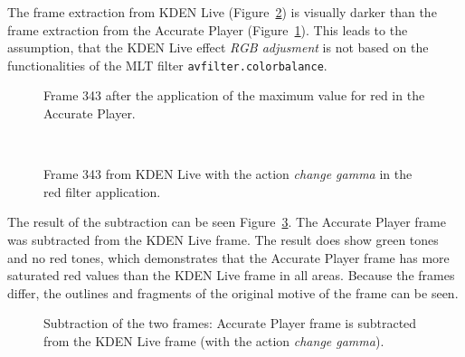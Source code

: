 \documentclass[../MasterThesis.tex]{subfiles}
\begin{document}
The frame extraction from KDEN Live (Figure~\ref{figure:gamma}) is visually darker than the frame extraction from the Accurate Player (Figure~\ref{figure:APframe1}). This leads to the assumption, that the KDEN Live effect \textit{RGB adjusment} is not based on the functionalities of the MLT filter \texttt{avfilter.colorbalance}.

\begin{minipage}{0.48\textwidth}
	\begin{figure}[H]
		\begin{center}
			\caption[Frame 343 after the application of the red filter in the Accurate Player.]{Frame 343 after the application of the maximum value for red in the Accurate Player.}
			\label{figure:APframe1}
		\end{center}
	\end{figure}
\end{minipage}\begin{minipage}{0.04\textwidth}
	\ 
\end{minipage}\begin{minipage}{0.48\textwidth}
	\begin{figure}[H]
		\begin{center}
			\caption[Frame 343 from KDEN Live with the action \textit{change gamma}.]{Frame 343 from KDEN Live with the action \textit{change gamma} in the red filter application.}
			\label{figure:gamma}
		\end{center}
	\end{figure}
\end{minipage}

\vspace*{1.2em}

The result of the subtraction can be seen Figure~\ref{figure:gammagimp}. The Accurate Player frame was subtracted from the KDEN Live frame. The result does show green tones and no red tones, which demonstrates that the Accurate Player frame has more saturated red values than the KDEN Live frame in all areas. Because the frames differ, the outlines and fragments of the original motive of the frame can be seen.



\begin{figure}[H]
	\begin{center}
		\caption[Subtraction of KDEN Live (\textit{change gamma}) and Accurate Player.]{Subtraction of the two frames: Accurate Player frame is subtracted from the KDEN Live frame (with the action \textit{change gamma}).}
		\label{figure:gammagimp}
	\end{center}
\end{figure}
\end{document}
